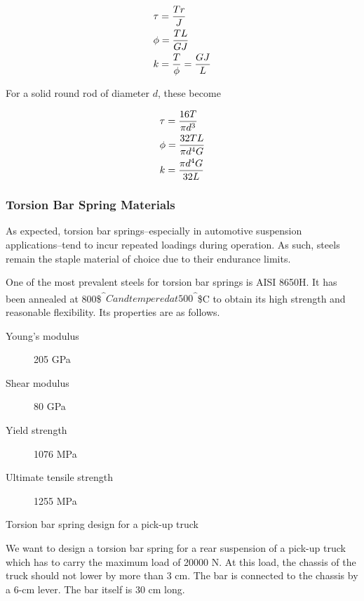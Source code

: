 \documentclass[a4paper,openany,nobib]{tufte-book}
\begin{document}
{{$$\begin{gathered}
    \tau  = \frac{Tr}{J} \hfill \\
    \phi  = \frac{TL}{GJ} \hfill \\
    k = \frac{T}{\phi} = \frac{GJ}{L} \hfill \\ 
  \end{gathered}$$

For a solid round rod of diameter \(d\), these become

$$\begin{gathered}
    \tau  = \frac{16T}{\pi d^3} \hfill \\
    \phi  = \frac{32TL}{\pi d^4G} \hfill \\
    k = \frac{\pi d^4G}{32L} \hfill \\ 
  \end{gathered}$$

\subsubsection{Torsion Bar Spring Materials}
\label{torsion-bar-spring-materials}
As expected, torsion bar springs--especially in automotive suspension
applications--tend to incur repeated loadings during operation. As such,
steels remain the staple material of choice due to their endurance
limits.

One of the most prevalent steels for torsion bar springs is AISI 8650H.
It has been annealed at 800\$\textsuperscript{\^{}}\(C and tempered at 500\)\textsuperscript{\^{}}\$C to
obtain its high strength and reasonable flexibility. Its properties are
as follows.

\begin{description}
\item[{Young's modulus}] 205 GPa

\item[{Shear modulus}] 80 GPa

\item[{Yield strength}] 1076 MPa

\item[{Ultimate tensile strength}] 1255 MPa
\end{description}

Torsion bar spring design for a pick-up truck

We want to design a torsion bar spring for a rear suspension of a
pick-up truck which has to carry the maximum load of 20000 N. At this
load, the chassis of the truck should not lower by more than 3 cm. The
bar is connected to the chassis by a 6-cm lever. The bar itself is 30 cm
long.

}}
\end{document}
